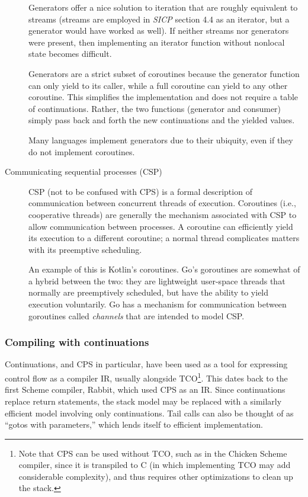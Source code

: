 \documentclass[]{article}
\begin{document}
\begin{description}
  Generators offer a nice solution to iteration that are roughly equivalent to streams (streams are employed in \textit{SICP} section 4.4 as an iterator, but a generator would have worked as well). If neither streams nor generators were present, then implementing an iterator function without nonlocal state becomes difficult.

  Generators are a strict subset of coroutines because the generator function can only yield to its caller, while a full coroutine can yield to any other coroutine. This simplifies the implementation and does not require a table of continuations. Rather, the two functions (generator and consumer) simply pass back and forth the new continuations and the yielded values.

  Many languages implement generators due to their ubiquity, even if they do not implement coroutines.
\item[Communicating sequential processes (CSP)] CSP (not to be confused with CPS) is a formal description of communication between concurrent threads of execution. Coroutines (i.e., cooperative threads) are generally the mechanism associated with CSP to allow communication between processes. A coroutine can efficiently yield its execution to a different coroutine; a normal thread complicates matters with its preemptive scheduling.

An example of this is Kotlin's coroutines. Go's goroutines are somewhat of a hybrid between the two: they are lightweight user-space threads that normally are preemptively scheduled, but have the ability to yield execution voluntarily. Go has a mechanism for communication between goroutines called \textit{channels} that are intended to model CSP.
\end{description}

\subsubsection{Compiling with continuations}
\label{sec:comp}

Continuations, and CPS in particular, have been used as a tool for expressing control flow as a compiler IR, usually alongside TCO\footnote{Note that CPS can be used without TCO, such as in the Chicken Scheme compiler, since it is transpiled to C (in which implementing TCO may add considerable complexity), and thus requires other optimizations to clean up the stack.}. This dates back to the first Scheme compiler, Rabbit, which used CPS as an IR. Since continuations replace return statements, the stack model may be replaced with a similarly efficient model involving only continuations. Tail calls can also be thought of as ``gotos with parameters,'' which lends itself to efficient implementation.
\end{document}
